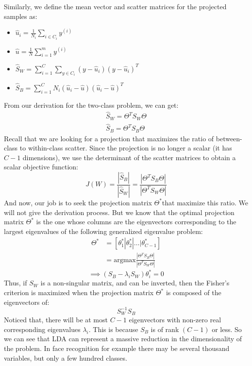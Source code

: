 \documentclass[a4paper]{article}
\begin{document}
Similarly, we define the mean vector and scatter matrices for the projected samples as:
\begin{itemize}
	\item $\hat{u}_i = \frac{1}{N_i} \sum_{i \in C_i} y^{(i)}$ 
	\item $\hat{u} = \frac{1}{N} \sum_{i=1}^{m}y^{(i)}$
	\item $ \hat{S}_W = \sum_{i=1}^{C}\sum_{y \in C_i} (y - \hat{u}_i)(y - \hat{u}_i)^T $
	\item $\hat{S}_B = \sum_{i=1}^{C} N_i (\hat{u}_i - \hat{u})(\hat{u}_i - \hat{u})^T$
\end{itemize}
From our derivation for the two-class problem, we can get:
\begin{align}
	\hat{S}_W = \Theta^T S_W \Theta \\
	\hat{S}_B =  \Theta^T S_B \Theta
\end{align}
Recall that we are looking for a projection that maximizes the ratio of between-class to within-class scatter. Since the projection is no longer a scalar (it has $C-1$ dimensions), we use the determinant of the scatter matrices to obtain a scalar objective function:
$$
	J(W) = \frac{|\hat{S}_B|}{|\hat{S}_W|} = \frac{|\Theta^T S_B \Theta|}{|\Theta^T S_W \Theta|}
$$
And now, our job is to seek the projection matrix $\Theta^{\ast} $that maximize this ratio. We will not give the derivation process. But we know that the optimal projection matrix $\Theta^{\ast}$ is the one whose columns are the eigenvectors corresponding to the largest eigenvalues of the following generalized eigenvalue problem:
\begin{align*}
	\Theta^{\ast} &= [\theta_{1}^{\ast} | \theta_{2}^{\ast} | \dots | \theta_{C-1}^{\ast}] \\
	&= \text{argmax} \frac{|\Theta^T S_B \Theta|}{|\Theta^T S_W \Theta|}
\end{align*}
$$
	\implies (S_B - \lambda_i S_W)\theta_{i}^{\ast} = 0
$$
Thus, if $S_W$ is a non-singular matrix, and can be inverted, then the Fisher's criterion is maximized when the projection matrix $\Theta^{\ast}$ is composed of the eigenvectors of:
$$
	S^{-1}_WS_B
$$
Noticed that, there will be at most $C-1$ eigenvectors with non-zero real corresponding eigenvalues $\lambda_i$. This is because $S_B$ is of rank $(C-1)$ or less. So we can see that LDA can represent a massive reduction in the dimensionality of the problem. In face recognition for example there may be several thousand variables, but only a few hundred classes. 
\end{document}
